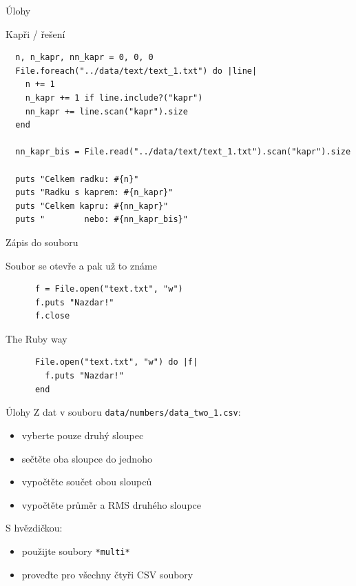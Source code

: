 \documentclass{beamer}
\begin{document}
\begin{frame}[fragile]{Úlohy}
  \begin{block}{Kapři / řešení}
    \tiny
\begin{verbatim}
  n, n_kapr, nn_kapr = 0, 0, 0
  File.foreach("../data/text/text_1.txt") do |line|
    n += 1
    n_kapr += 1 if line.include?("kapr")
    nn_kapr += line.scan("kapr").size
  end

  nn_kapr_bis = File.read("../data/text/text_1.txt").scan("kapr").size

  puts "Celkem radku: #{n}"
  puts "Radku s kaprem: #{n_kapr}"
  puts "Celkem kapru: #{nn_kapr}"
  puts "        nebo: #{nn_kapr_bis}"
\end{verbatim}
  \end{block}
\end{frame}

\begin{frame}[fragile]{Zápis do souboru}
  \begin{block}{Soubor se otevře a pak už to známe}
    \begin{verbatim}
      f = File.open("text.txt", "w")
      f.puts "Nazdar!"
      f.close
    \end{verbatim}
  \end{block}
  \pause
  \begin{block}{The Ruby way}
    \begin{verbatim}
      File.open("text.txt", "w") do |f|
        f.puts "Nazdar!"
      end
    \end{verbatim}
  \end{block}
\end{frame}

\begin{frame}{Úlohy}
  Z dat v souboru \texttt{data/numbers/data\_two\_1.csv}:
  \begin{itemize}
    \item vyberte pouze druhý sloupec
    \item sečtěte oba sloupce do jednoho
    \item vypočtěte součet obou sloupců
    \item vypočtěte průměr a RMS druhého sloupce
  \end{itemize}
  S hvězdičkou:
  \begin{itemize}
    \item použijte soubory \texttt{*multi*}
    \item proveďte pro všechny čtyři CSV soubory
  \end{itemize}
\end{frame}
\end{document}
